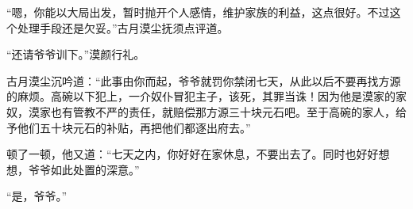 \begin{this_body}
“嗯，你能以大局出发，暂时抛开个人感情，维护家族的利益，这点很好。不过这个处理手段还是欠妥。”古月漠尘抚须点评道。

“还请爷爷训下。”漠颜行礼。

古月漠尘沉吟道：“此事由你而起，爷爷就罚你禁闭七天，从此以后不要再找方源的麻烦。高碗以下犯上，一介奴仆冒犯主子，该死，其罪当诛！因为他是漠家的家奴，漠家也有管教不严的责任，就赔偿那方源三十块元石吧。至于高碗的家人，给予他们五十块元石的补贴，再把他们都逐出府去。”

顿了一顿，他又道：“七天之内，你好好在家休息，不要出去了。同时也好好想想，爷爷如此处置的深意。”

“是，爷爷。”

\end{this_body}

